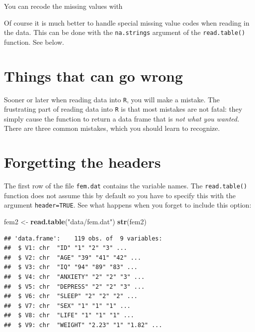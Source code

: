 \documentclass[
]{book}
\newenvironment{Shaded}{\begin{snugshade}}{\end{snugshade}}
\newcommand{\ConstantTok}[1]{\textcolor[rgb]{0.56,0.35,0.01}{#1}}
\newcommand{\DecValTok}[1]{\textcolor[rgb]{0.00,0.00,0.81}{#1}}
\newcommand{\FunctionTok}[1]{\textcolor[rgb]{0.13,0.29,0.53}{\textbf{#1}}}
\newcommand{\NormalTok}[1]{#1}
\newcommand{\OtherTok}[1]{\textcolor[rgb]{0.56,0.35,0.01}{#1}}
\newcommand{\SpecialCharTok}[1]{\textcolor[rgb]{0.81,0.36,0.00}{\textbf{#1}}}
\newcommand{\StringTok}[1]{\textcolor[rgb]{0.31,0.60,0.02}{#1}}
\begin{document}
You can recode the missing values with

\begin{Shaded}
\end{Shaded}

Of course it is much better to handle special missing value codes
when reading in the data. This can be done with the
\texttt{na.strings} argument of the \texttt{read.table()}
function. See below.

\section{Things that can go wrong}\label{things-that-can-go-wrong}

Sooner or later when reading data into \texttt{R}, you will make a
mistake. The frustrating part of reading data into \texttt{R} is that
most mistakes are not fatal: they simply cause the function to return
a data frame that is \emph{not what you wanted.} There are three
common mistakes, which you should learn to recognize.

\section{Forgetting the headers}\label{forgetting-the-headers}

The first row of the file \texttt{fem.dat} contains the variable names.
The \texttt{read.table()} function does not assume this by default so
you have to specify this with the argument \texttt{header=TRUE}. See
what happens when you forget to include this option:

\begin{Shaded}
\begin{Highlighting}[]
\NormalTok{fem2 }\OtherTok{\textless{}{-}} \FunctionTok{read.table}\NormalTok{(}\StringTok{"data/fem.dat"}\NormalTok{)}
\FunctionTok{str}\NormalTok{(fem2)}
\end{Highlighting}
\end{Shaded}

\begin{verbatim}
## 'data.frame':    119 obs. of  9 variables:
##  $ V1: chr  "ID" "1" "2" "3" ...
##  $ V2: chr  "AGE" "39" "41" "42" ...
##  $ V3: chr  "IQ" "94" "89" "83" ...
##  $ V4: chr  "ANXIETY" "2" "2" "3" ...
##  $ V5: chr  "DEPRESS" "2" "2" "3" ...
##  $ V6: chr  "SLEEP" "2" "2" "2" ...
##  $ V7: chr  "SEX" "1" "1" "1" ...
##  $ V8: chr  "LIFE" "1" "1" "1" ...
##  $ V9: chr  "WEIGHT" "2.23" "1" "1.82" ...
\end{verbatim}
\end{document}
